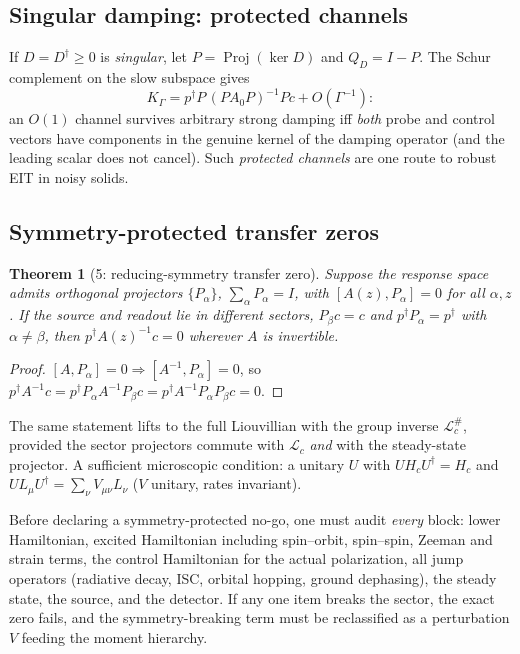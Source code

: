 \documentclass[11pt,a4paper]{article}
\newtheorem{theorem}{Theorem}[section]
\theoremstyle{remark}
\begin{document}
\subsection{Singular damping: protected channels}

If $D=D^\dagger\ge0$ is \emph{singular}, let $P=\operatorname{Proj}(\ker D)$
and $Q_D=I-P$. The Schur complement on the slow subspace gives
\begin{equation}
K_\Gamma=p^\dagger P\,(PA_0P)^{-1}P c+O(\Gamma^{-1}) :
\end{equation}
an $O(1)$ channel survives arbitrary strong damping iff \emph{both} probe and
control vectors have components in the genuine kernel of the damping operator
(and the leading scalar does not cancel). Such \emph{protected channels} are
one route to robust EIT in noisy solids.

\subsection{Symmetry-protected transfer zeros}

\begin{theorem}[5: reducing-symmetry transfer zero]
\label{thm:symm}
Suppose the response space admits orthogonal projectors $\{P_\alpha\}$,
$\sum_\alpha P_\alpha=I$, with $[A(z),P_\alpha]=0$ for all $\alpha,z$. If the
source and readout lie in different sectors, $P_\beta c=c$ and
$p^\dagger P_\alpha=p^\dagger$ with $\alpha\neq\beta$, then
$p^\dagger A(z)^{-1}c=0$ wherever $A$ is invertible.
\end{theorem}

\begin{proof}
$[A,P_\alpha]=0\Rightarrow[A^{-1},P_\alpha]=0$, so
$p^\dagger A^{-1}c
=p^\dagger P_\alpha A^{-1}P_\beta c
=p^\dagger A^{-1}P_\alpha P_\beta c=0$.
\end{proof}

The same statement lifts to the full Liouvillian with the group inverse
$\mathcal{L}_c^{\#}$, provided the sector projectors commute with
$\mathcal{L}_c$ \emph{and} with the steady-state projector. A sufficient
microscopic condition: a unitary $U$ with $UH_cU^\dagger=H_c$ and
$UL_\mu U^\dagger=\sum_\nu V_{\mu\nu}L_\nu$ ($V$ unitary, rates invariant).

\begin{warningbox}
Before declaring a symmetry-protected no-go, one must audit \emph{every}
block: lower Hamiltonian, excited Hamiltonian including spin--orbit,
spin--spin, Zeeman and strain terms, the control Hamiltonian for the actual
polarization, all jump operators (radiative decay, ISC, orbital hopping,
ground dephasing), the steady state, the source, and the detector. If any one
item breaks the sector, the exact zero fails, and the symmetry-breaking term
must be reclassified as a perturbation $V$ feeding the moment hierarchy.
\end{warningbox}
\end{document}
